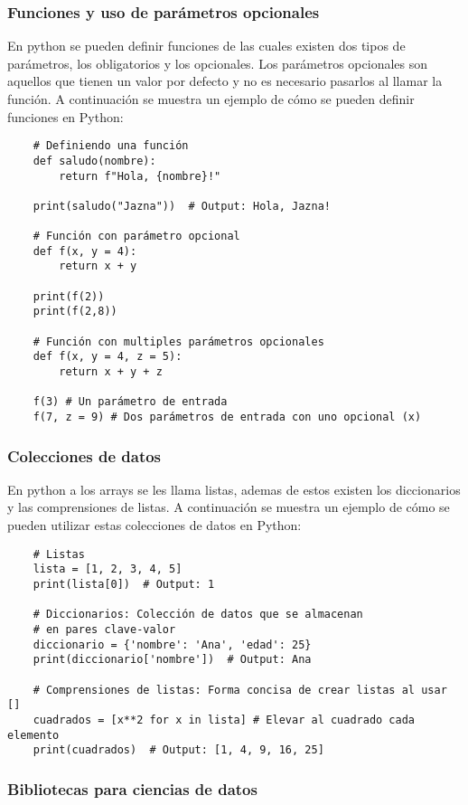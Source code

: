 \documentclass{templateNote}
\begin{document}
\subsubsection*{Funciones y uso de parámetros opcionales}
En python se pueden definir funciones de las cuales existen dos tipos de parámetros, los obligatorios y los opcionales. Los parámetros opcionales son aquellos que tienen un valor por defecto y no es necesario pasarlos al llamar la función. A continuación se muestra un ejemplo de cómo se pueden definir funciones en Python:
\begin{lstlisting}
    # Definiendo una función
    def saludo(nombre):
        return f"Hola, {nombre}!"
    
    print(saludo("Jazna"))  # Output: Hola, Jazna!

    # Función con parámetro opcional
    def f(x, y = 4):
        return x + y

    print(f(2))
    print(f(2,8))

    # Función con multiples parámetros opcionales
    def f(x, y = 4, z = 5):
        return x + y + z

    f(3) # Un parámetro de entrada
    f(7, z = 9) # Dos parámetros de entrada con uno opcional (x)
\end{lstlisting}

\subsubsection*{Colecciones de datos}
En python a los arrays se les llama listas, ademas de estos existen los diccionarios y las comprensiones de listas. A continuación se muestra un ejemplo de cómo se pueden utilizar estas colecciones de datos en Python:
\begin{lstlisting}
    # Listas
    lista = [1, 2, 3, 4, 5]
    print(lista[0])  # Output: 1

    # Diccionarios: Colección de datos que se almacenan 
    # en pares clave-valor
    diccionario = {'nombre': 'Ana', 'edad': 25}
    print(diccionario['nombre'])  # Output: Ana

    # Comprensiones de listas: Forma concisa de crear listas al usar []
    cuadrados = [x**2 for x in lista] # Elevar al cuadrado cada elemento 
    print(cuadrados)  # Output: [1, 4, 9, 16, 25]
\end{lstlisting}

\subsubsection*{Bibliotecas para ciencias de datos}
\end{document}
